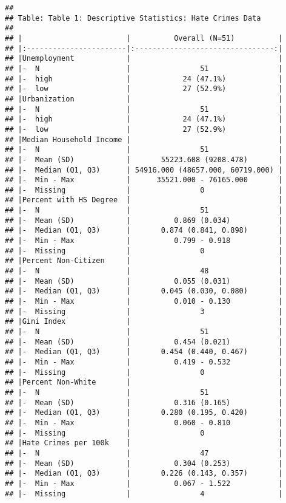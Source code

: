 \documentclass[
]{article}
\begin{document}
\begin{verbatim}
## 
## Table: Table 1: Descriptive Statistics: Hate Crimes Data
## 
## |                        |          Overall (N=51)          |
## |:-----------------------|:--------------------------------:|
## |Unemployment            |                                  |
## |-  N                    |                51                |
## |-  high                 |            24 (47.1%)            |
## |-  low                  |            27 (52.9%)            |
## |Urbanization            |                                  |
## |-  N                    |                51                |
## |-  high                 |            24 (47.1%)            |
## |-  low                  |            27 (52.9%)            |
## |Median Household Income |                                  |
## |-  N                    |                51                |
## |-  Mean (SD)            |       55223.608 (9208.478)       |
## |-  Median (Q1, Q3)      | 54916.000 (48657.000, 60719.000) |
## |-  Min - Max            |      35521.000 - 76165.000       |
## |-  Missing              |                0                 |
## |Percent with HS Degree  |                                  |
## |-  N                    |                51                |
## |-  Mean (SD)            |          0.869 (0.034)           |
## |-  Median (Q1, Q3)      |       0.874 (0.841, 0.898)       |
## |-  Min - Max            |          0.799 - 0.918           |
## |-  Missing              |                0                 |
## |Percent Non-Citizen     |                                  |
## |-  N                    |                48                |
## |-  Mean (SD)            |          0.055 (0.031)           |
## |-  Median (Q1, Q3)      |       0.045 (0.030, 0.080)       |
## |-  Min - Max            |          0.010 - 0.130           |
## |-  Missing              |                3                 |
## |Gini Index              |                                  |
## |-  N                    |                51                |
## |-  Mean (SD)            |          0.454 (0.021)           |
## |-  Median (Q1, Q3)      |       0.454 (0.440, 0.467)       |
## |-  Min - Max            |          0.419 - 0.532           |
## |-  Missing              |                0                 |
## |Percent Non-White       |                                  |
## |-  N                    |                51                |
## |-  Mean (SD)            |          0.316 (0.165)           |
## |-  Median (Q1, Q3)      |       0.280 (0.195, 0.420)       |
## |-  Min - Max            |          0.060 - 0.810           |
## |-  Missing              |                0                 |
## |Hate Crimes per 100k    |                                  |
## |-  N                    |                47                |
## |-  Mean (SD)            |          0.304 (0.253)           |
## |-  Median (Q1, Q3)      |       0.226 (0.143, 0.357)       |
## |-  Min - Max            |          0.067 - 1.522           |
## |-  Missing              |                4                 |
\end{verbatim}
\end{document}
